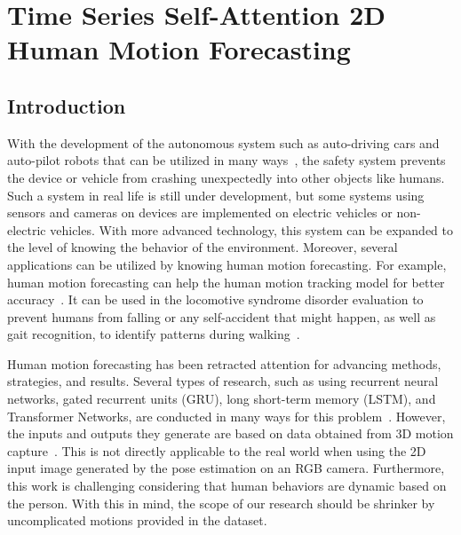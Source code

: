 
\chapter{Time Series Self-Attention 2D Human Motion Forecasting}\label{3} %


\section{Introduction}
With the development of the autonomous system such as auto-driving cars and auto-pilot robots that can be utilized in many ways~\cite{autonomous_driving, autonomous_driving_road, autonomous_robot_nature}, the safety system prevents the device or vehicle from crashing unexpectedly into other objects like humans.
Such a system in real life is still under development, but some systems using sensors and cameras on devices are implemented on electric vehicles or non-electric vehicles. With more advanced technology, this system can be expanded to the level of knowing the behavior of the environment.
Moreover, several applications can be utilized by knowing human motion forecasting.
For example, human motion forecasting can help the human motion tracking model for better accuracy~\cite{motion_tracking}.
It can be used in the locomotive syndrome disorder evaluation to prevent humans from falling or any self-accident that might happen, as well as gait recognition, to identify patterns during walking~\cite{jaciii_gait}.

Human motion forecasting has been retracted attention for advancing methods, strategies, and results. Several types of research, such as using recurrent neural networks, gated recurrent units (GRU), long short-term memory (LSTM), and Transformer Networks, are conducted in many ways for this problem~\cite{jain2016, martinez2017, chiu2019, Mao2019, wang2021}. However, the inputs and outputs they generate are based on data obtained from 3D motion capture~\cite{motionmixer2022, Sofianos2021}. This is not directly applicable to the real world when using the 2D input image generated by the pose estimation on an RGB camera. Furthermore, this work is challenging considering that human behaviors are dynamic based on the person. With this in mind, the scope of our research should be shrinker by uncomplicated motions provided in the dataset.

